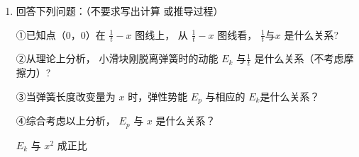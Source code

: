 \begin{enumerate}
\begin{enumerate}
\banswer{
  
}



\item 
回答下列问题：（不要求写出计算
或推导过程）




①已知点（$ 0 $，$ 0 $）在 $ \frac{1}{t}-x $ 图线上，
从 $ \frac{1}{t}-x $ 图线看， $ \frac{1}{t} $与$ x $ 是什么关系?



②从理论上分析，
小滑块刚脱离弹簧时的动能 $ E_{k} $ 与$ \frac{1}{t} $
是什么关系（不考虑摩擦力）?













③当弹簧长度改变量为 $ x $ 时，弹性势能 $ E_{p} $ 与相应的
$ E_k $是什么关系？



④综合考虑以上分析， $ E_{p} $ 与 $ x $ 是什么关系？


$E_{k}$ 与 $x^{2}$ 成正比


\end{enumerate}





\end{enumerate}

